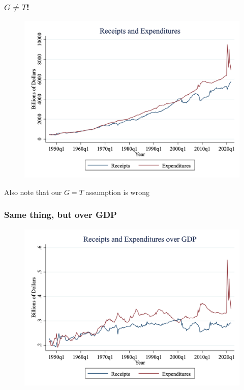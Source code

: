 \documentclass{beamer}
\begin{document}
\begin{frame}
\frametitle[alignment=center]{$G\neq T$!}
\begin{figure}
\centering
\includegraphics[scale=0.2]{Figures/GoverY_4.png}
\end{figure}
Also note that our $G=T$ assumption is wrong
\end{frame}

\begin{frame}
\frametitle[alignment=center]{Same thing, but over GDP}
\begin{figure}
\centering
\includegraphics[scale=0.2]{Figures/GoverY_5.png}
\end{figure}
\end{frame}
\end{document}
